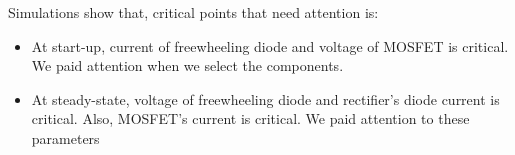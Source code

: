 Simulations show that, critical points that need attention is:
\begin{itemize}
    \item At start-up, current of freewheeling diode and voltage of MOSFET is critical. We paid attention when we select the components.
    \item At steady-state, voltage of freewheeling diode and rectifier's diode current is critical. Also, MOSFET's current is critical. We paid attention to these parameters 
\end{itemize}





